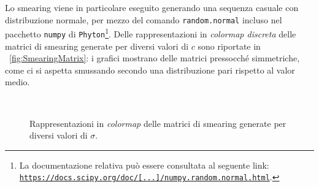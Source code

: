  \noindent Lo smearing viene in particolare eseguito generando una sequenza casuale con distribuzione normale, per mezzo del comando \texttt{random.normal} incluso nel pacchetto \texttt{numpy} di \texttt{Phyton}\footnote{La documentazione relativa può essere consultata al seguente link: \href{https://docs.scipy.org/doc/numpy-1.15.0/reference/generated/numpy.random.normal.html}{\texttt{https://docs.scipy.org/doc/[...]/numpy.random.normal.html}}.}. Delle rappresentazioni in \emph{colormap discreta} delle matrici di smearing generate per diversi valori di $c$ sono riportate in \figurename~\ref{fig:SmearingMatrix}: i grafici mostrano delle matrici pressocché simmetriche, come ci si aspetta smussando secondo una distribuzione pari rispetto al valor medio.
 
\captionsetup*[subfigure]{position=bottom}
\begin{figure} 
	\centering
	\caption{Rappresentazioni in \emph{colormap} delle matrici di smearing generate per diversi valori di $\sigma$.}
	\\

\end{figure}
